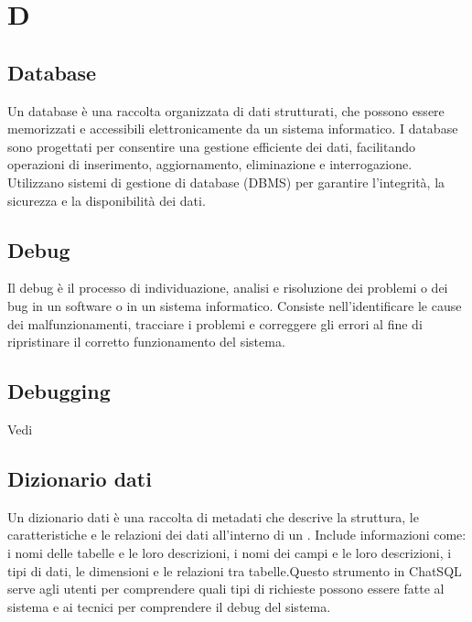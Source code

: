 \section{D}

\vspace{2em}
\subsection*{Database}
Un database è una raccolta organizzata di dati strutturati, che possono essere memorizzati e accessibili elettronicamente da un sistema informatico. I database sono progettati per consentire una gestione efficiente dei dati, facilitando operazioni di inserimento, aggiornamento, eliminazione e interrogazione. Utilizzano sistemi di gestione di database (DBMS) per garantire l'integrità, la sicurezza e la disponibilità dei dati.

\vspace{2em}
\subsection*{Debug}
Il debug è il processo di individuazione, analisi e risoluzione dei problemi o dei bug in un software o in un sistema informatico. Consiste nell'identificare le cause dei malfunzionamenti, tracciare i problemi e correggere gli errori al fine di ripristinare il corretto funzionamento del sistema. 

\vspace{2em}
\subsection*{Debugging}
\par Vedi 

\vspace{2em}
\subsection*{Dizionario dati}
Un dizionario dati è una raccolta di metadati che descrive la struttura, le caratteristiche e le relazioni dei dati all'interno di un . Include informazioni come: i nomi delle tabelle e le loro descrizioni, i nomi dei campi e le loro descrizioni, i tipi di dati, le dimensioni e le relazioni tra tabelle.Questo strumento in ChatSQL serve agli utenti per comprendere quali tipi di richieste possono essere fatte al sistema e ai tecnici per comprendere il debug del sistema.

